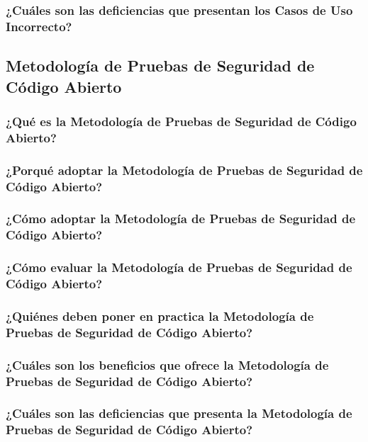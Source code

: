 \documentclass[runningheads,a4paper]{llncs}
\begin{document}
\subsubsection{¿Cuáles son las deficiencias que presentan los Casos de Uso Incorrecto?}


\subsection{Metodología de Pruebas de Seguridad de Código Abierto}

\subsubsection{¿Qué es la Metodología de Pruebas de Seguridad de Código Abierto?}

\subsubsection{¿Porqué adoptar la Metodología de Pruebas de Seguridad de Código Abierto?}

\subsubsection{¿Cómo adoptar la Metodología de Pruebas de Seguridad de Código Abierto?}

\subsubsection{¿Cómo evaluar la Metodología de Pruebas de Seguridad de Código Abierto?}

\subsubsection{¿Quiénes deben poner en practica la Metodología de Pruebas de Seguridad de Código Abierto?}

\subsubsection{¿Cuáles son los beneficios que ofrece la Metodología de Pruebas de Seguridad de Código Abierto?}

\subsubsection{¿Cuáles son las deficiencias que presenta la Metodología de Pruebas de Seguridad de Código Abierto?}
\end{document}
